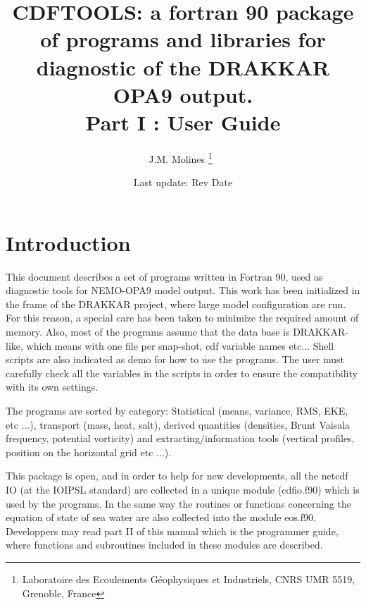 \documentclass[a4paper,11pt]{article}
\begin{document}
\newcommand{\etal}{{\it et al.}}
\newcommand{\DegN}{$^{\circ}$N}
\newcommand{\DegW}{$^{\circ}$W}
\newcommand{\DegE}{$^{\circ}$E}
\newcommand{\DegS}{$^{\circ}$S}
\newcommand{\Deg}{$^{\circ}$}
\newcommand{\DegC}{$^{\circ}$C}
\newcommand{\DS}{ \renewcommand{\baselinestretch}{1.8} \tiny \normalsize}
\newcommand{\ST}{ \renewcommand{\baselinestretch}{1.2} \tiny \normalsize}
\newcommand{\ao}{add\_offset}
\newcommand{\SF}{scale\_factor}

\title{CDFTOOLS: a fortran 90 package of programs and libraries for diagnostic 
of the DRAKKAR OPA9 output.\\
Part I : User Guide }

\author{J.M. Molines  \thanks{Laboratoire des Ecoulements G\'eophysiques et Industriels, CNRS UMR 5519, Grenoble, France}\ }


\date{Last update: $ $Rev$ $ $ $Date$ $ }


\maketitle
\section*{Introduction}
This document describes a set of programs written in Fortran 90, used as diagnostic tools for 
NEMO-OPA9 model output. This work has been initialized in the frame of the DRAKKAR project, where 
large model configuration are run. For this reason, a special care has been taken to minimize the
required amount of memory. Also, most of the programs assume that the data base is DRAKKAR-like,
which means with one file per snap-shot, cdf variable names etc...  Shell scripts are also indicated
as demo for how to use the programs. The user must carefully check all the variables in the scripts in
order to ensure the compatibility with its own settings.

The programs are sorted by category: Statistical (means, variance, RMS, EKE, etc ...), transport (mass,
heat, salt), derived quantities (densities, Brunt Vaisala frequency, potential vorticity) and extracting/information tools
(vertical profiles, position on the horizontal grid etc ...).

This package is open, and in order to help for new developments, all the netcdf IO (at the IOIPSL standard) 
are collected in a unique  module (cdfio.f90) which is used by the programs. In the same way the routines or
functions concerning the equation of state of sea water are also collected into the module eos.f90.
Developpers may read part II of this manual which is the programmer guide, where
functions and subroutines included in these modules are described.
\end{document}
